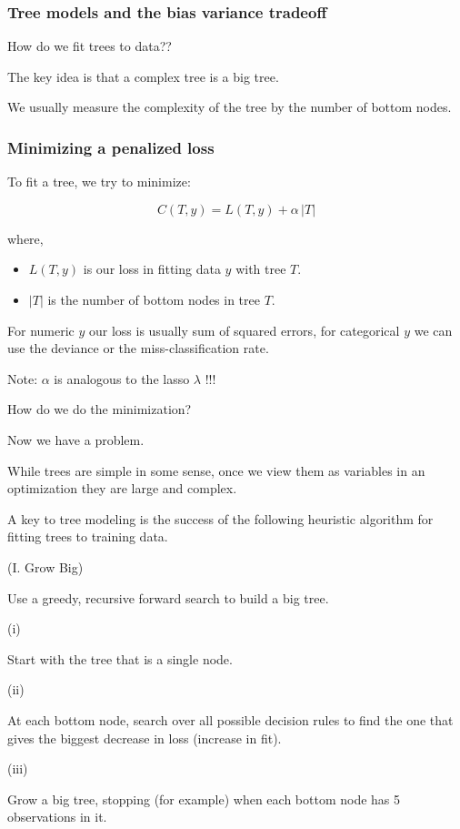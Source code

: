 \documentclass{beamer}
\newcommand{\bl}{\color{lightblue}}
\newcommand{\rd}{\color{burntorange}}
\newcommand{\bi}{\begin{itemize}}
\newcommand{\ib}{\end{itemize}}
\newcommand{\p}{\item}
\newcommand{\sko}{\vspace{.1in}}
\newcommand{\skoo}{\vspace{.2in}}
\newcommand{\skooo}{\vspace{.3in}}
\begin{document}
\begin{frame}
\frametitle{Tree models and the bias variance tradeoff}

How do we fit trees to data??\skooo

The key idea is that a {\color{red}complex} tree is  a {\color{red}big} tree.\skoo

We usually measure the complexity of the tree by the number of bottom nodes.

\end{frame}
\begin{frame}
\frametitle{Minimizing a penalized loss}
To fit a tree, we try to minimize:

$$
C(T,y) = L(T,y) + \alpha \, |T|
$$

where,\skoo

\bi
\p $L(T,y)$ is our loss in fitting data $y$ with tree $T$.
\p $|T|$ is the number of bottom nodes in tree $T$.
\ib\skoo

For numeric $y$ our loss is usually {\color{red}sum of squared errors}, for categorical
$y$ we can use the {\color{red}deviance} or the {\color{red}miss-classification rate}.\skoo

Note: $\alpha$ is analogous to the lasso $\lambda$ !!!
\end{frame}
\begin{frame}

{\bl \Large How do we do the minimization?}

\vspace{.3in}

Now we have a problem.\skooo

While trees are simple in some sense, once we view them as variables
in an optimization they are large and complex.\skooo

A key to tree modeling is the success of the following heuristic algorithm
for fitting trees to training data.
\end{frame}
\begin{frame}

{\bl (I. Grow Big)}\sko

Use a greedy, recursive forward search to build a big tree.\sko

{\rd (i)}\sko

Start with the tree that is a single node.\skoo

{\rd (ii)}\sko

At each bottom node, search over all possible decision rules to find the one
that gives the biggest decrease in loss (increase in fit).  \skoo

{\rd (iii)}\sko

Grow a big tree, stopping (for example) when each bottom node has 5 observations
in it.
\end{frame}
\end{document}
